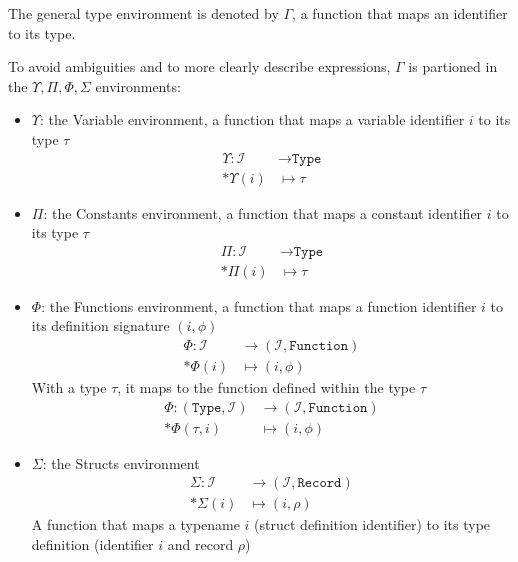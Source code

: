 \documentclass[11pt]{report}
\newcommand{\Id}{\mathcal{I}}
\newcommand{\Type}{\texttt{Type}}
\newcommand{\Function}{\texttt{Function}}
\newcommand{\Record}{\texttt{Record}}
\newcommand{\Env}{\Gamma}
\newcommand{\EnvVar}{\Upsilon}
\newcommand{\EnvConst}{\Pi}
\newcommand{\EnvFunc}{\Phi}
\newcommand{\EnvStucts}{\Sigma}
\theoremstyle{definition}
\begin{document}
The general type environment is denoted by $\Env$, a function that maps an
identifier to its type.

To avoid ambiguities and to more clearly describe expressions, $\Env$ is
partioned in the $\EnvVar,\EnvConst,\EnvFunc,\EnvStucts$ environments:

\begin{itemize}
	\item $\EnvVar$: the Variable environment, a function that maps a variable
		identifier $i$ to its type $\tau$
		\[
			\begin{split}
				\EnvVar : \Id &\to \Type\\*
				\EnvVar(i)    &\mapsto \tau
			\end{split}
		\]
	\item $\EnvConst$: the Constants environment, a function that maps a
		constant identifier $i$ to its type $\tau$
		\[
			\begin{split}
				\EnvConst : \Id &\to \Type\\*
				\EnvConst(i)    &\mapsto \tau
			\end{split}
		\]
	\item $\EnvFunc$: the Functions environment, a function that maps a
		function identifier $i$ to its definition signature $(i, \phi)$
		\[
			\begin{split}
				\EnvFunc : \Id &\to (\Id, \Function)\\*
				\EnvFunc(i)    &\mapsto (i, \phi)
			\end{split}
		\]
		With a type $\tau$, it maps to the function defined within the type
		$\tau$
		\[
			\begin{split}
				\EnvFunc : (\Type,\Id) &\to (\Id, \Function)\\*
				\EnvFunc(\tau, i)      &\mapsto (i, \phi)
			\end{split}
		\]
	\item $\EnvStucts$: the Structs environment
		\[
			\begin{split}
				\EnvStucts : \Id &\to (\Id, \Record)\\*
				\EnvStucts(i)    &\mapsto (i, \rho)
			\end{split}
		\]
		A function that maps a typename $i$ (struct definition identifier) to
		its type definition (identifier $i$ and record $\rho$)
\end{itemize}
\end{document}
